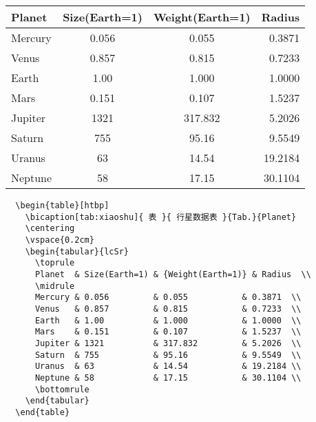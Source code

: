 \begin{table}[htbp]
  \centering
  \vspace{0.2cm}
  \begin{tabular}{lcSr}
    \toprule
    Planet  & Size(Earth=1) & {Weight(Earth=1)} & Radius  \\
    \midrule
    Mercury & 0.056         & 0.055           & 0.3871  \\
    Venus   & 0.857         & 0.815           & 0.7233  \\ 
    Earth   & 1.00          & 1.000           & 1.0000  \\ 
    Mars    & 0.151         & 0.107           & 1.5237  \\ 
    Jupiter & 1321          & 317.832         & 5.2026  \\ 
    Saturn  & 755           & 95.16           & 9.5549  \\ 
    Uranus  & 63            & 14.54           & 19.2184 \\ 
    Neptune & 58            & 17.15           & 30.1104 \\ 
    \bottomrule
  \end{tabular}
\end{table}

\begin{lstlisting}
  \begin{table}[htbp]
    \bicaption[tab:xiaoshu]{ 表 }{ 行星数据表 }{Tab.}{Planet}
    \centering
    \vspace{0.2cm}
    \begin{tabular}{lcSr}
      \toprule
      Planet  & Size(Earth=1) & {Weight(Earth=1)} & Radius  \\
      \midrule
      Mercury & 0.056         & 0.055           & 0.3871  \\
      Venus   & 0.857         & 0.815           & 0.7233  \\ 
      Earth   & 1.00          & 1.000           & 1.0000  \\ 
      Mars    & 0.151         & 0.107           & 1.5237  \\ 
      Jupiter & 1321          & 317.832         & 5.2026  \\ 
      Saturn  & 755           & 95.16           & 9.5549  \\ 
      Uranus  & 63            & 14.54           & 19.2184 \\ 
      Neptune & 58            & 17.15           & 30.1104 \\ 
      \bottomrule
    \end{tabular}
  \end{table}
\end{lstlisting}

